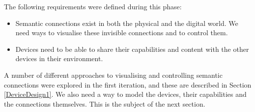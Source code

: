 The following requirements were defined during this phase:

\begin{itemize}
	\item Semantic connections exist in both the physical and the digital world. We need ways to visualise these invisible connections and to control them. 
	\item Devices need to be able to share their capabilities and content with the other devices in their environment.
\end{itemize}

A number of different approaches to visualising and controlling semantic connections were explored in the first iteration, and these are described in Section \ref{DeviceDesign1}. We also need a way to model the devices, their capabilities and the connections themselves. This is the subject of the next section.



%  
% 
% 

